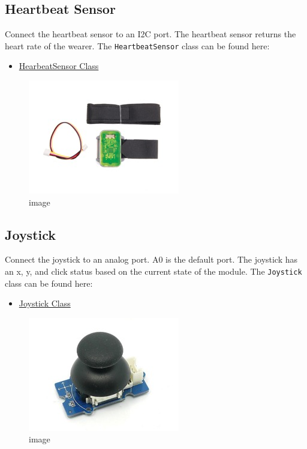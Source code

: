 \subsection{Heartbeat Sensor}\label{heartbeat-sensor}

Connect the heartbeat sensor to an I2C port. The heartbeat sensor
returns the heart rate of the wearer. The \texttt{HeartbeatSensor} class
can be found here:

\begin{itemize}
\tightlist
\item
  \href{https://github.com/cloudmesh/cloudmesh.pi/blob/master/cloudmesh/pi/heartbeat.py}{HearbeatSensor
  Class}
\end{itemize}

\begin{figure}
\centering
\includegraphics{../images/grovepi/heartbeat.jpg}
\caption{image}
\end{figure}

\subsection{Joystick}\label{joystick}

Connect the joystick to an analog port. A0 is the default port. The
joystick has an x, y, and click status based on the current state of the
module. The \texttt{Joystick} class can be found here:

\begin{itemize}
\tightlist
\item
  \href{https://github.com/cloudmesh/cloudmesh.pi/blob/master/cloudmesh/pi/joystick.py}{Joystick
  Class}
\end{itemize}

\begin{figure}
\centering
\includegraphics{../images/grovepi/joystick.jpg}
\caption{image}
\end{figure}

